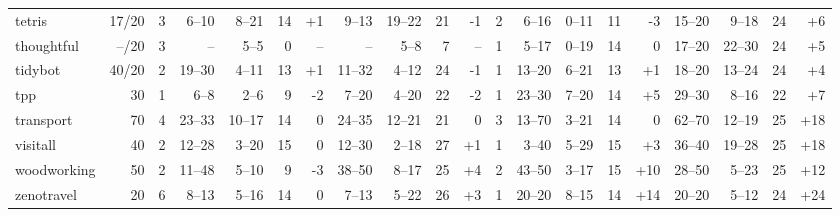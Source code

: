 \documentclass{article}
\begin{document}
\begin{table}
\begin{tabular}{l@{}rr|rrrr|rrrr|r|rrrr|rrrr}
        tetris &  17/20 &   3 &    6--10 &   8--21 &  14 &  {\color{blue}+1} &    9--13 &  19--22 &  21 &    {\color{red}-1} &   2 &     6--16 &   0--11 &  11 &    {\color{red}-3} &    15--20 &   9--18 &  24 &   {\color{blue}+6} \\
    thoughtful &  --/20 &   3 &       -- &    5--5 &   0 &                -- &       -- &    5--8 &   7 &                 -- &   1 &     5--17 &   0--19 &  14 &                  0 &    17--20 &  22--30 &  24 &   {\color{blue}+5} \\
       tidybot &  40/20 &   2 &   19--30 &   4--11 &  13 &  {\color{blue}+1} &   11--32 &   4--12 &  24 &    {\color{red}-1} &   1 &    13--20 &   6--21 &  13 &   {\color{blue}+1} &    18--20 &  13--24 &  24 &   {\color{blue}+4} \\
           tpp &     30 &   1 &     6--8 &    2--6 &   9 &   {\color{red}-2} &    7--20 &   4--20 &  22 &    {\color{red}-2} &   1 &    23--30 &   7--20 &  14 &   {\color{blue}+5} &    29--30 &   8--16 &  22 &   {\color{blue}+7} \\
     transport &     70 &   4 &   23--33 &  10--17 &  14 &                 0 &   24--35 &  12--21 &  21 &                  0 &   3 &    13--70 &   3--21 &  14 &                  0 &    62--70 &  12--19 &  25 &  {\color{blue}+18} \\
      visitall &     40 &   2 &   12--28 &   3--20 &  15 &                 0 &   12--30 &   2--18 &  27 &   {\color{blue}+1} &   1 &     3--40 &   5--29 &  15 &   {\color{blue}+3} &    36--40 &  19--28 &  25 &  {\color{blue}+18} \\
   woodworking &     50 &   2 &   11--48 &   5--10 &   9 &   {\color{red}-3} &   38--50 &   8--17 &  25 &   {\color{blue}+4} &   2 &    43--50 &   3--17 &  15 &  {\color{blue}+10} &    28--50 &   5--23 &  25 &  {\color{blue}+12} \\
    zenotravel &     20 &   6 &    8--13 &   5--16 &  14 &                 0 &    7--13 &   5--22 &  26 &   {\color{blue}+3} &   1 &    20--20 &   8--15 &  14 &  {\color{blue}+14} &    20--20 &   5--12 &  24 &  {\color{blue}+24} \\
\bottomrule
\end{tabular}

                        \end{table}
                        
\end{document}
